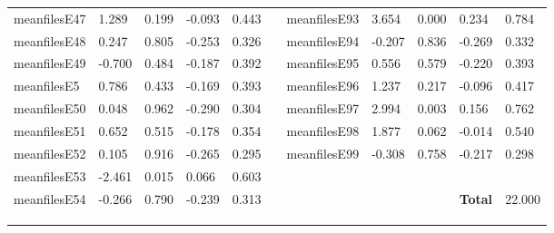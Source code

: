 \begin{table}[h!]
\begin{tabular}{lllllllllll}
meanfilesE47  & 1.289            & 0.199            & -0.093              & 0.443               &           & meanfilesE93  & 3.654            & 0.000            & 0.234               & 0.784               \\
meanfilesE48  & 0.247            & 0.805            & -0.253              & 0.326               &           & meanfilesE94  & -0.207           & 0.836            & -0.269              & 0.332               \\
meanfilesE49  & -0.700           & 0.484            & -0.187              & 0.392               &           & meanfilesE95  & 0.556            & 0.579            & -0.220              & 0.393               \\
meanfilesE5   & 0.786            & 0.433            & -0.169              & 0.393               &           & meanfilesE96  & 1.237            & 0.217            & -0.096              & 0.417               \\
meanfilesE50  & 0.048            & 0.962            & -0.290              & 0.304               &           & meanfilesE97  & 2.994            & 0.003            & 0.156               & 0.762               \\
meanfilesE51  & 0.652            & 0.515            & -0.178              & 0.354               &           & meanfilesE98  & 1.877            & 0.062            & -0.014              & 0.540               \\
meanfilesE52  & 0.105            & 0.916            & -0.265              & 0.295               &           & meanfilesE99  & -0.308           & 0.758            & -0.217              & 0.298               \\ \cline{7-11} 
meanfilesE53  & -2.461           & 0.015            & 0.066               & 0.603               &           &               &                  &                  &                     &                     \\
meanfilesE54  & -0.266           & 0.790            & -0.239              & 0.313               &           &               &                  &                  & \textbf{Total}      & 22.000              \\
              &                  &                  &                     &                     &           &               &                  &                  &                     &                     \\
              &                  &                  &                     &                     &           &               &                  &                  &                     &                     \\
              &                  &                  &                     &                     &           &               &                  &                  &                     &                    
\end{tabular}
\end{table}

